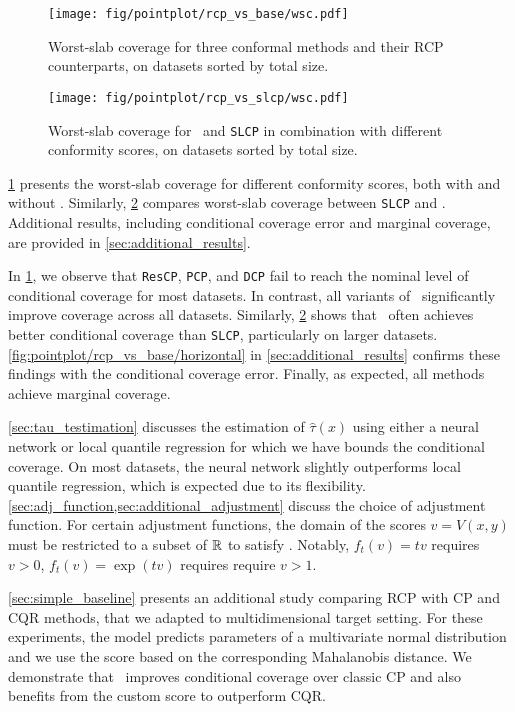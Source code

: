   \begin{figure}[t!]
    \centering
    \texttt{[image: fig/pointplot/rcp\_vs\_base/wsc.pdf]}
    \caption{Worst-slab coverage for three conformal methods and their RCP counterparts, on datasets sorted by total size.}
    \label{fig:pointplot/rcp_vs_base/wsc}
  \end{figure}

  \begin{figure}[t!]
    \centering
    \texttt{[image: fig/pointplot/rcp\_vs\_slcp/wsc.pdf]}
    \caption{Worst-slab coverage for \RCP\ and \texttt{SLCP} in combination with different conformity scores, on datasets sorted by total size.}
    \label{fig:pointplot/rcp_vs_slcp/wsc}
  \end{figure}


  \cref{fig:pointplot/rcp_vs_base/wsc} presents the worst-slab coverage for different conformity scores, both with and without \RCP. Similarly, \cref{fig:pointplot/rcp_vs_slcp/wsc} compares worst-slab coverage between \texttt{SLCP} and \RCP. Additional results, including conditional coverage error and marginal coverage, are provided in \cref{sec:additional_results}.

  In \cref{fig:pointplot/rcp_vs_base/wsc}, we observe that \texttt{ResCP}, \texttt{PCP}, and \texttt{DCP} fail to reach the nominal level of conditional coverage for most datasets. In contrast, all variants of \RCP\ significantly improve coverage across all datasets. Similarly, \cref{fig:pointplot/rcp_vs_slcp/wsc} shows that \RCP\ often achieves better conditional coverage than \texttt{SLCP}, particularly on larger datasets. \cref{fig:pointplot/rcp_vs_base/horizontal} in \cref{sec:additional_results} confirms these findings with the conditional coverage error. Finally, as expected, all methods achieve marginal coverage.
  
  \cref{sec:tau_testimation} discusses the estimation of $\widehat{\tau}(x)$ using either a neural network or local quantile regression for which we have bounds the conditional coverage. On most datasets, the neural network slightly outperforms local quantile regression, which is expected due to its flexibility.
  \cref{sec:adj_function,sec:additional_adjustment} discuss the choice of adjustment function. For certain adjustment functions, the domain of the scores $v = V(x, y)$ must be restricted to a subset of $\mathbb{R}$ to satisfy . Notably, $f_t(v) = tv$ requires $v > 0$, $f_t(v) = \exp(tv)$ requires require $v>1$.
  
  \cref{sec:simple_baseline} presents an additional study comparing RCP with CP and CQR methods, that we adapted to multidimensional target setting. For these experiments, the model predicts parameters of a multivariate normal distribution and we use the score based on the corresponding Mahalanobis distance. We demonstrate that \RCP\ improves conditional coverage over classic CP and also benefits from the custom score to outperform CQR.
